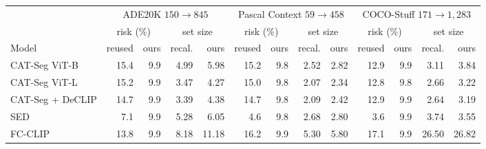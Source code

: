 \setlength{\tabcolsep}{4pt}\begin{tabular}{@{}lrrrrrrrrrrrr@{}}
\toprule
& \multicolumn{4}{c}{ADE20K $150\!\to\!845$} & \multicolumn{4}{c}{Pascal Context $59\!\to\!458$} & \multicolumn{4}{c}{COCO-Stuff $171\!\to\!1{,}283$} \\
\cmidrule(lr){2-5}\cmidrule(lr){6-9}\cmidrule(l){10-13}
& \multicolumn{2}{c}{risk (\%)} & \multicolumn{2}{c}{set size} & \multicolumn{2}{c}{risk (\%)} & \multicolumn{2}{c}{set size} & \multicolumn{2}{c}{risk (\%)} & \multicolumn{2}{c}{set size} \\
\cmidrule(lr){2-3}\cmidrule(lr){4-5}\cmidrule(lr){6-7}\cmidrule(lr){8-9}\cmidrule(lr){10-11}\cmidrule(l){12-13}
Model & reused & ours & recal. & ours & reused & ours & recal. & ours & reused & ours & recal. & ours \\
\midrule
CAT-Seg ViT-B & 15.4 & 9.9 & 4.99 & 5.98 & 15.2 & 9.8 & 2.52 & 2.82 & 12.9 & 9.9 & 3.11 & 3.84 \\
CAT-Seg ViT-L & 15.2 & 9.9 & 3.47 & 4.27 & 15.0 & 9.8 & 2.07 & 2.34 & 12.8 & 9.8 & 2.66 & 3.22 \\
CAT-Seg + DeCLIP & 14.7 & 9.9 & 3.39 & 4.38 & 14.7 & 9.8 & 2.09 & 2.42 & 12.9 & 9.9 & 2.64 & 3.19 \\
SED & 7.1 & 9.9 & 5.28 & 6.05 & 4.6 & 9.8 & 2.68 & 2.80 & 3.6 & 9.9 & 3.74 & 3.55 \\
FC-CLIP & 13.8 & 9.9 & 8.18 & 11.18 & 16.2 & 9.9 & 5.30 & 5.80 & 17.1 & 9.9 & 26.50 & 26.82 \\
\bottomrule
\end{tabular}
